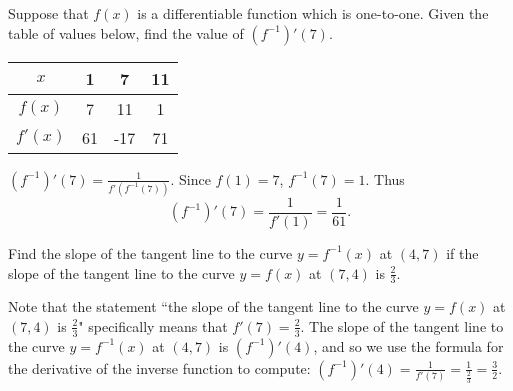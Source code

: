 \documentclass[handout,nooutcomes]{ximera}
\renewenvironment{freeResponse}{
\ifhandout\setbox0\vbox\bgroup\else
\begin{trivlist}\item[\hskip \labelsep\bfseries Solution:\hspace{2ex}]
\fi}
{\ifhandout\egroup\else
\end{trivlist}
\fi}
\begin{document}
\begin{problem}
Suppose that $f(x)$ is a differentiable function which is one-to-one.  Given the table of values below, find the value of $(f^{-1})'(7)$.  

\begin{tabular}{|c|c|c|c|}
\hline
$x$	&	1	&	7	&	11	\\
\hline
$f(x)$	&	7	&	11	&	1	\\
\hline
$f'(x)$	&	61	&	-17	&	71	\\
\hline
\end{tabular}

		\begin{freeResponse}
		$(f^{-1})'(7) = \frac{1}{f'(f^{-1}(7))}.$  Since $f(1) = 7$, $f^{-1}(7) = 1$.  Thus 
		$$(f^{-1})'(7) = \frac{1}{f'(1)} = \frac{1}{61}.$$
		\end{freeResponse}
\end{problem}

\begin{problem}
  Find the slope of the tangent line to the curve $y = f^{-1}(x)$ at $(4,7)$ if the slope of the tangent line to the curve $y=f(x)$ at $(7,4)$ is $\frac{2}{3}$.
  \begin{freeResponse}
    Note that the statement ``the slope of the tangent line to the curve $y=f(x)$ at $(7,4)$ is $\frac{2}{3}$" specifically means that $f'(7) = \frac{2}{3}$.
    The slope of the tangent line to the curve $y = f^{-1}(x)$ at $(4,7)$ is $(f^{-1})'(4)$, and so we use the formula for the derivative of the inverse function to compute: $(f^{-1})'(4) = \frac{1}{f'(7)} = \frac{1}{\frac{2}{3}} = \frac{3}{2}$.
  \end{freeResponse}
\end{problem}
\end{document}
